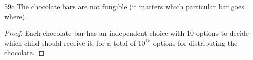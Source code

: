 \begin{exercise}{59c}
    The chocolate bars are not fungible (it matters which particular bar goes where).
\end{exercise}
\begin{proof}
        Each chocolate bar has an independent choice with 10 options to decide which child should receive it, for a total of $10^{15}$ options for distributing the chocolate.
\end{proof}

